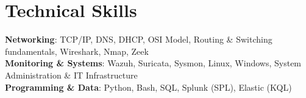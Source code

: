 \documentclass[a4paper,11pt]{article}
\begin{document}
\section{Technical Skills}
  \begin{itemize}[leftmargin=0.5cm, label={}]
     \small{\item{
      \textbf{Networking}{: TCP/IP, DNS, DHCP, OSI Model, Routing \& Switching fundamentals, Wireshark, Nmap, Zeek} \\
      \textbf{Monitoring \& Systems}{: Wazuh, Suricata, Sysmon, Linux, Windows, System Administration \& IT Infrastructure} \\
      \textbf{Programming \& Data}{: Python, Bash, SQL, Splunk (SPL), Elastic (KQL)} \\
     }}
  \end{itemize}

\end{document}
